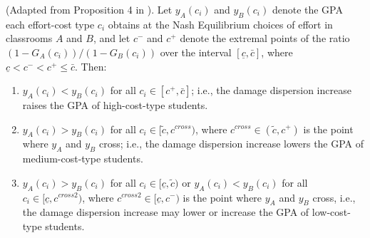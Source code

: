 \begin{proposition}\label{prop3} \textnormal{(Adapted from Proposition 4 in \cite{hopkins2004running}).} Let \( y_A(c_i) \) and \( y_B(c_i) \) denote the GPA each effort-cost type $c_i$ obtains at the Nash Equilibrium choices of effort in classrooms $A$ and $B$, and let $c^{-}$ and $c^{+}$ denote the extremal points of the ratio $(1-G_A(c_i))/(1-G_B(c_i))$ over the interval $[\underline{c},\bar{c}]$, where $\underline{c}<c^{-}<c^{+}\leq\bar{c}$. Then:
\begin{enumerate}[label=(\roman*),itemsep=0pt,parsep=0pt,topsep=0pt]
\item $y_A(c_i)<y_B(c_i)$ for all $c_i\in [c^{+},\bar{c}]$; i.e., the damage dispersion increase raises the GPA of high-cost-type students.
\item $y_A(c_i)>y_B(c_i)$ for all $c_i\in[\tilde{c},c^{cross})$, where $c^{cross}\in(\tilde{c},c^{+})$ is the point where $y_A$ and $y_B$ cross; i.e., the damage dispersion increase lowers the GPA of medium-cost-type students.  
\item $y_A(c_i)>y_B(c_i)$ for all $c_i\in [\underline{c},\tilde{c})$ or $y_A(c_i)<y_B(c_i)$ for all $c_i\in [\underline{c},c^{cross2})$, where $c^{cross2}\in[\underline{c},c^{-})$ is the point where $y_A$ and $y_B$ cross, i.e., the damage dispersion increase may lower or increase the GPA of low-cost-type students.
\end{enumerate}

\end{proposition}

